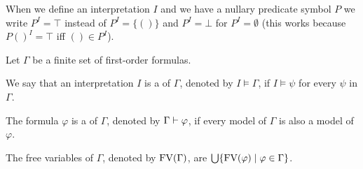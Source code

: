 When we define an interpretation $I$ and we have a nullary predicate symbol $P$ we write $P^I=\top$ instead of $P^I=\{()\}$ and $P^I=\bot$ for $P^I=\emptyset$ (this works because $P()^I=\top$ iff $()\in P^I$).
\begin{definition}\label{def.2.23} %
	Let $\Gamma$ be a finite set of first-order formulas.
	\begin{description}
		\item We say that an interpretation $I$ is a  of $\Gamma$, denoted by $I\models\Gamma$, if $I\models\psi$ for every $\psi$ in $\Gamma$.
		\item The formula $\varphi$ is a  of $\Gamma$, denoted by $\Gamma\vdash\varphi$, if every model of $\Gamma$ is also a model of $\varphi$.
		\item The free variables of $\Gamma$, denoted by $\text{FV}(\Gamma)$, are $\bigcup\{\text{FV}(\varphi)\mid \varphi\in \Gamma\}$.
	\end{description}
\end{definition}


